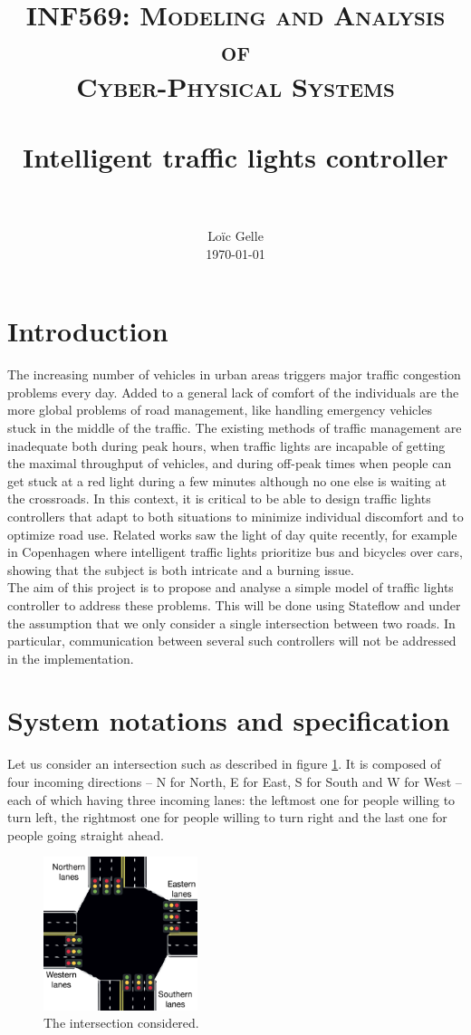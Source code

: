 \documentclass[paper=a4, fontsize=11pt]{scrartcl}
\title{	
		\usefont{OT1}{bch}{b}{n}
		\normalfont \normalsize \textsc{INF569: Modeling and Analysis of \\ Cyber-Physical Systems} \\ [25pt]
		\horrule{0.5pt} \\[0.4cm]
		\huge Intelligent traffic lights controller \\
		\horrule{2pt} \\[0.5cm]
}
\author{
		\normalfont 								\normalsize
        Lo\"{i}c Gelle\\[-3pt]		\normalsize
        \today
}
\date{}
\numberwithin{figure}{section}			%
\numberwithin{table}{section}				%
\begin{document}
\maketitle
\section{Introduction}

The increasing number of vehicles in urban areas triggers major traffic congestion problems every day. Added to a general lack of comfort of the individuals are the more global problems of road management, like handling emergency vehicles stuck in the middle of the traffic. The existing methods of traffic management are inadequate both during peak hours, when traffic lights are incapable of getting the maximal throughput of vehicles, and during off-peak times when people can get stuck at a red light during a few minutes although no one else is waiting at the crossroads. In this context, it is critical to be able to design traffic lights controllers that adapt to both situations to minimize individual discomfort and to optimize road use. Related works saw the light of day quite recently, for example in Copenhagen where intelligent traffic lights prioritize bus and bicycles over cars, showing that the subject is both intricate and a burning issue.\\

The aim of this project is to propose and analyse a simple model of traffic lights controller to address these problems. This will be done using Stateflow and under the assumption that we only consider a single intersection between two roads. In particular, communication between several such controllers will not be addressed in the implementation.

\section{System notations and specification}

Let us consider an intersection such as described in figure \ref{intersection}. It is composed of four incoming directions -- N for North, E for East, S for South and W for West -- each of which having three incoming lanes: the leftmost one for people willing to turn left, the rightmost one for people willing to turn right and the last one for people going straight ahead.

\begin{figure}[!ht]
    \center
    \includegraphics[width=0.4\textwidth]{./images/intersection.png}
    \caption{\label{intersection} The intersection considered.}
\end{figure}
\end{document}
